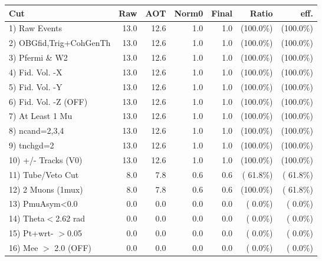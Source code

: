  \begin{table}[h!]\centering
 \begin{tabular}{||l||r|r|r|r|r|r||}
 \hline
 \hline
 Cut & Raw & AOT & Norm0 & Final & Ratio & eff.       \\
 \hline
  1) Raw Events           &         13.0 &         12.6 &          1.0 &          1.0 & (100.0\%) & (100.0\%) \\
  2) OBGfid,Trig+CohGenTh &         13.0 &         12.6 &          1.0 &          1.0 & (100.0\%) & (100.0\%) \\
  3) Pfermi \& W2         &         13.0 &         12.6 &          1.0 &          1.0 & (100.0\%) & (100.0\%) \\
  4) Fid. Vol. -X         &         13.0 &         12.6 &          1.0 &          1.0 & (100.0\%) & (100.0\%) \\
  5) Fid. Vol. -Y         &         13.0 &         12.6 &          1.0 &          1.0 & (100.0\%) & (100.0\%) \\
  6) Fid. Vol. -Z (OFF)   &         13.0 &         12.6 &          1.0 &          1.0 & (100.0\%) & (100.0\%) \\
  7) At Least 1 Mu        &         13.0 &         12.6 &          1.0 &          1.0 & (100.0\%) & (100.0\%) \\
  8) ncand=2,3,4          &         13.0 &         12.6 &          1.0 &          1.0 & (100.0\%) & (100.0\%) \\
  9) tnchgd=2             &         13.0 &         12.6 &          1.0 &          1.0 & (100.0\%) & (100.0\%) \\
 10) +/- Tracks (V0)      &         13.0 &         12.6 &          1.0 &          1.0 & (100.0\%) & (100.0\%) \\
 11) Tube/Veto Cut        &          8.0 &          7.8 &          0.6 &          0.6 & ( 61.8\%) & ( 61.8\%) \\
 12) 2 Muons (1mux)       &          8.0 &          7.8 &          0.6 &          0.6 & (100.0\%) & ( 61.8\%) \\
 13) PmuAsym<0.0          &          0.0 &          0.0 &          0.0 &          0.0 & (  0.0\%) & (  0.0\%) \\
 14) Theta$<$2.62 rad     &          0.0 &          0.0 &          0.0 &          0.0 & (  0.0\%) & (  0.0\%) \\
 15) Pt+wrt- $>$0.05      &          0.0 &          0.0 &          0.0 &          0.0 & (  0.0\%) & (  0.0\%) \\
 16) Mee $>$ 2.0  (OFF)   &          0.0 &          0.0 &          0.0 &          0.0 & (  0.0\%) & (  0.0\%) \\

\end{tabular}
\end{table}
